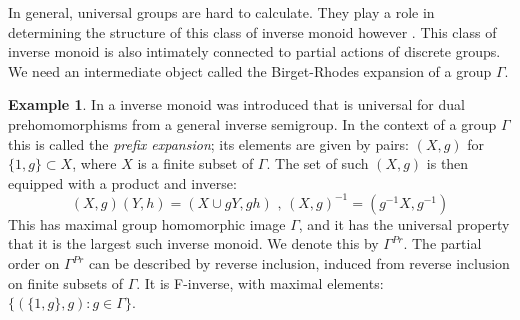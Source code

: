 \documentclass[11pt,a4paper]{amsart}
\theoremstyle{plain}
\theoremstyle{definition}%
\newtheorem{example}[theorem]{Example}%
\theoremstyle{remark}%
\begin{document}
In general, universal groups are hard to calculate. They play a role in determining the structure of this class of inverse monoid however \cite{}. This class of inverse monoid is also intimately connected to partial actions of discrete groups. We need an intermediate object called the Birget-Rhodes expansion of a group $\Gamma$.

\begin{example}
In \cite{MR745358,MR2221438} a inverse monoid was introduced that is universal for dual prehomomorphisms from a general inverse semigroup. In the context of a group $\Gamma$ this is called the \textit{prefix expansion}; its elements are given by pairs: $(X,g)$ for $\lbrace 1,g\rbrace \subset X$, where $X$ is a finite subset of $\Gamma$. The set of such $(X,g)$ is then equipped with a product and inverse:
\begin{equation*}
(X,g)(Y,h) = (X\cup gY,gh)\mbox{ , } (X,g)^{-1}=(g^{-1}X,g^{-1})
\end{equation*}
This has maximal group homomorphic image $\Gamma$, and it has the universal property that it is the largest such inverse monoid. We denote this by $\Gamma^{Pr}$. The partial order on $\Gamma^{Pr}$ can be described by reverse inclusion, induced from reverse inclusion on finite subsets of $\Gamma$. It is F-inverse, with maximal elements: $\lbrace(\lbrace 1,g \rbrace, g):g \in \Gamma \rbrace$.
\end{example}
\end{document}
